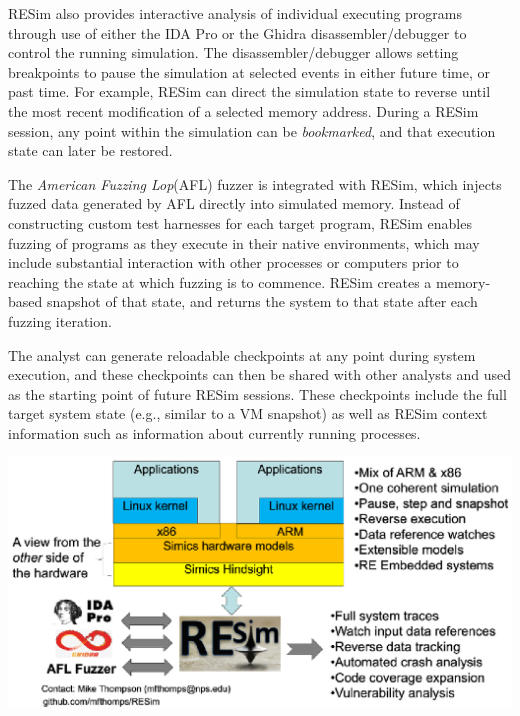 \documentclass[titlepage]{article}
\begin{document}
RESim also provides interactive analysis of individual executing programs through use of either the IDA Pro or the Ghidra
disassembler/debugger to control the running simulation.  The disassembler/debugger
allows setting breakpoints to pause the simulation at selected events in either future time, or past time.  For 
example, RESim can direct the simulation state to reverse until the most recent modification of a selected memory address.   During a RESim session,
any point within the simulation can be \textit{bookmarked}, and that execution state can later be restored.  

The \textit{American Fuzzing Lop}(AFL) fuzzer is integrated with RESim, which injects fuzzed data generated by AFL directly into simulated 
memory.  Instead of constructing custom test harnesses for each target program, RESim enables fuzzing of programs as they execute in their native environments,
which may include substantial interaction with other processes or computers prior to reaching the state at which fuzzing is to commence. RESim creates a memory-based
snapshot of that state, and returns the system to that state after each fuzzing iteration.  

The analyst can generate reloadable checkpoints at any point during system execution, and these checkpoints can then be shared with other analysts and used as the 
starting point of future RESim sessions.  These checkpoints include the full target system state (e.g., similar to a VM snapshot) as well as 
RESim context information such as
information about currently running processes.
  

\includegraphics{resimfig.eps}
\end{document}
